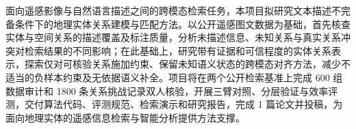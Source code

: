 面向遥感影像与自然语言描述之间的跨模态检索任务，本项目拟研究文本描述不完备条件下的地理实体关系建模与匹配方法。以公开遥感图文数据为基础，首先核查实体与空间关系的描述覆盖及标注质量，分析未描述信息、未知关系与真实关系冲突对检索结果的不同影响；在此基础上，研究带有证据和可信程度的实体关系表示，探索仅对可核验关系施加约束、保留未知语义状态的跨模态对齐方法，减少不适当的负样本约束及无依据语义补全。项目将在两个公开检索基准上完成 600 组数据审计和 1800 条关系挑战记录双人核验，开展三臂对照、分层验证与效率评测，交付算法代码、评测规范、检索演示和研究报告，完成 1 篇论文并投稿，为面向地理实体的遥感信息检索与智能分析提供方法支撑。
